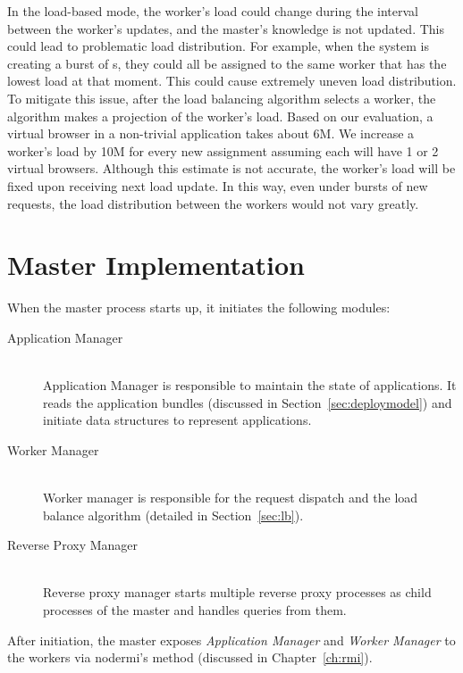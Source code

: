 In the load-based mode,  the worker's load could change during the interval
between the worker's updates, and the master's knowledge is not updated. This
could lead to problematic load distribution. For example,  when the system is
creating a burst of \appins{}s, they could all be assigned to the same worker
that has the lowest load at that moment.  This could cause extremely uneven
load distribution. To mitigate this issue,  after the load balancing algorithm
selects a worker, the algorithm makes a projection of the worker's load. Based
on our evaluation, a virtual browser in a non-trivial application takes about
6M.  We increase a worker's load by 10M for every new \appins assignment
assuming each \appins will have 1 or 2  virtual browsers. Although this
estimate is not accurate, the worker's load will be fixed upon receiving next
load update. In this way, even under bursts of new requests,  the load
distribution between the workers would not vary greatly.



\section{Master Implementation}

When the master process starts up, it initiates the following modules:

\begin{description}
\item[Application Manager] \hfill \\
Application Manager is responsible to maintain the state of applications. It
reads the application bundles (discussed in Section~\ref{sec:deploymodel}) and
initiate data structures to represent applications.

\item[Worker Manager] \hfill \\
Worker manager is responsible for the request dispatch 
and the load balance algorithm (detailed in Section~\ref{sec:lb}).

\item[Reverse Proxy Manager] \hfill \\
Reverse proxy manager starts multiple reverse proxy processes as child
processes of the master and handles queries from them.
\end{description}

After initiation, the master exposes \emph{Application Manager} and
\emph{Worker Manager} to the workers via nodermi's   method
(discussed in Chapter~\ref{ch:rmi}).  

